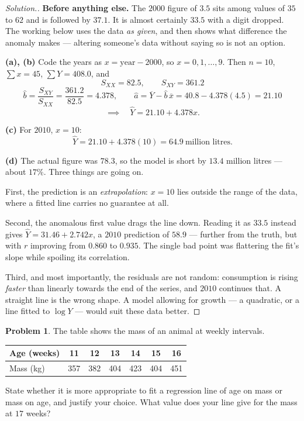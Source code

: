 \documentclass[11pt,a4paper]{article}
\theoremstyle{definition}
\newtheorem{problemx}{Problem}[section]
\newenvironment{problem}{\begin{problemx}}{\end{problemx}}
\newenvironment{solution}
  {\renewcommand{\qedsymbol}{}\begin{proof}[\textit{Solution}.]}
  {\end{proof}}
\begin{document}
\begin{solution}
\textbf{Before anything else.} The $2000$ figure of $3.5$ sits among values of $35$ to $62$
and is followed by $37.1$. It is almost certainly $33.5$ with a digit dropped. The working
below uses the data \emph{as given}, and then shows what difference the anomaly makes ---
altering someone's data without saying so is not an option.

\textbf{(a), (b)} Code the years as $x=\text{year}-2000$, so $x=0,1,\ldots,9$. Then $n=10$,
$\sum x=45$, $\sum Y=408.0$, and
\[S_{XX}=82.5,\qquad S_{XY}=361.2\]
\[\widehat{b}=\frac{S_{XY}}{S_{XX}}=\frac{361.2}{82.5}=4.378,\qquad
\widehat{a}=\overline{Y}-\widehat{b}\,\overline{x}=40.8-4.378(4.5)=21.10\]
\[\implies\quad \widehat{Y}=21.10+4.378x.\]

\textbf{(c)} For $2010$, $x=10$:
\[\widehat{Y}=21.10+4.378(10)=64.9\ \text{million litres}.\]

\textbf{(d)} The actual figure was $78.3$, so the model is short by $13.4$ million litres ---
about $17\%$. Three things are going on.

First, the prediction is an \emph{extrapolation}: $x=10$ lies outside the range of the data,
where a fitted line carries no guarantee at all.

Second, the anomalous first value drags the line down. Reading it as $33.5$ instead gives
$\widehat{Y}=31.46+2.742x$, a $2010$ prediction of $58.9$ --- further from the truth, but with
$r$ improving from $0.860$ to $0.935$. The single bad point was flattering the fit's slope
while spoiling its correlation.

Third, and most importantly, the residuals are not random: consumption is rising
\emph{faster} than linearly towards the end of the series, and $2010$ continues that. A
straight line is the wrong shape. A model allowing for growth --- a quadratic, or a line
fitted to $\log Y$ --- would suit these data better.
\end{solution}

\begin{problem}
The table shows the mass of an animal at weekly intervals.
\begin{table}[H]
\centering
\begin{tabular}{|l|c|c|c|c|c|c|}
\hline
Age (weeks) & 11 & 12 & 13 & 14 & 15 & 16\\
\hline
Mass (kg) & 357 & 382 & 404 & 423 & 404 & 451\\
\hline
\end{tabular}
\end{table}
State whether it is more appropriate to fit a regression line of age on mass or mass on age,
and justify your choice. What value does your line give for the mass at $17$ weeks?
\end{problem}
\end{document}

